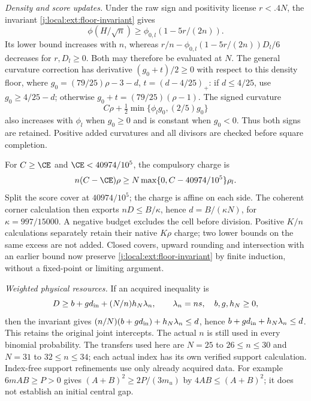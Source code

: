 \emph{Density and score updates.} Under the raw sign and positivity
license $r<.4N$, the invariant \eqref{j:local:ext:floor-invariant} gives
\[
 \phi(H/\sqrt n)\ge\phi_{0,l}(1-5r/(2n)).
\]
Its lower bound increases with $n$, whereas
$r/n-\phi_{0,l}(1-5r/(2n))D_l/6$ decreases for $r,D_l\ge0$.
Both may therefore be evaluated at $N$. The general curvature
correction has derivative $(g_0+t)/2\ge0$ with respect to this
density floor, where $g_0=(79/25)\rho-3-d$, $t=(d-4/25)_+$:
if $d\le4/25$, use $g_0\ge4/25-d$; otherwise
$g_0+t=(79/25)(\rho-1)$. The signed curvature
\[
 C\rho+\tfrac12\min\{\phi_lg_0,(2/5)g_0\}
\]
also increases with $\phi_l$ when $g_0\ge0$ and is constant
when $g_0<0$. Thus both signs are retained. Positive added
curvatures and all divisors are checked before square completion.

For $C\ge\CE$ and $\CE<40974/10^5$, the compulsory charge is
\[
 n(C-\CE)\rho\ge
 N\max\{0,C-40974/10^5\}\rho_l.
\]
Split the score cover at $40974/10^5$; the charge is affine on
each side. The coherent corner calculation then exports
$nD\le B/\kappa$, hence $d=B/(\kappa N)$, for
$\kappa=997/15000$. A negative budget excludes the cell before
division. Positive $K/n$ calculations separately retain their native
$K\rho$ charge; two lower bounds on the same excess are not added.
Closed covers, upward rounding and intersection with an earlier
bound now preserve \eqref{j:local:ext:floor-invariant} by finite
induction, without a fixed-point or limiting argument.

\emph{Weighted physical resources.} If an acquired inequality is
\[
 D\ge b+g d_{\rm in}+(N/n)h_N\lambda_n,
 \qquad \lambda_n=ns,\quad b,g,h_N\ge0,
\]
then the invariant gives
$(n/N)(b+g d_{\rm in})+h_N\lambda_n\le d$, hence
$b+g d_{\rm in}+h_N\lambda_n\le d$.
This retains the original joint intercepts. The actual $n$ is still
used in every binomial probability. The transfers used here are
$N=25$ to $26\le n\le30$ and $N=31$ to $32\le n\le34$;
each actual index has its own verified support calculation.
Index-free support refinements use only already acquired data. For
example $6mAB\ge P>0$ gives $(A+B)^2\ge2P/(3m_u)$ by
$4AB\le(A+B)^2$; it does not establish an initial central gap.

